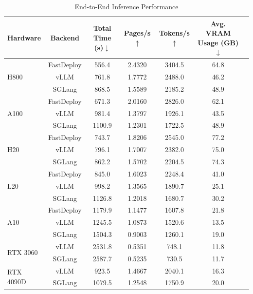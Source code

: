 \documentclass[11pt, a4paper,logo,  copyright, nonumbering]{paddleocr}
\begin{document}
\begin{table}[H]
  \centering

  \renewcommand{\arraystretch}{1.2}
  \begin{tabular}{l|c|ccccc}
    \toprule
    \textbf{Hardware} & \textbf{Backend} & \textbf{Total Time (s)$\downarrow$} & \textbf{Pages/s$\uparrow$} & \textbf{Tokens/s$\uparrow$} & \textbf{Avg. VRAM Usage (GB)$\downarrow$} \\
    \midrule
    \multirow{3}{*}{H800} & FastDeploy & 556.4 & 2.4320 & 3404.5 & 64.8 \\ & vLLM & 761.8 & 1.7772 & 2488.0 & 46.2 \\
                          & SGLang & 868.5 & 1.5589 & 2185.2 & 48.9 \\
    \midrule
    \multirow{3}{*}{A100} & FastDeploy & 671.3 & 2.0160 & 2826.0 & 62.1 \\ & vLLM & 981.4 & 1.3797 & 1926.1 & 43.5 \\
                          & SGLang & 1100.9 & 1.2301 & 1722.5 & 48.9 \\
    \midrule
    \multirow{3}{*}{H20} & FastDeploy & 743.7 & 1.8206 & 2545.0 & 77.2 \\ & vLLM & 796.1 & 1.7007 & 2382.0 & 75.0 \\
                          & SGLang & 862.2 & 1.5702 & 2204.5 & 74.3 \\
    \midrule
    \multirow{3}{*}{L20} & FastDeploy & 845.0 & 1.6023 & 2248.4 & 41.0 \\ & vLLM & 998.2 & 1.3565  & 1890.7 & 25.1 \\
                          & SGLang & 1126.8 & 1.2018 & 1680.7 & 30.2 \\
    \midrule
    \multirow{3}{*}{A10} & FastDeploy & 1179.9 & 1.1477 & 1607.8 & 21.8 \\ & vLLM & 1245.5 & 1.0873 & 1520.6 & 13.5 \\
                          & SGLang & 1504.3 & 0.9003 & 1260.1 & 19.0 \\
    \midrule
    \multirow{2}{*}{RTX 3060} & vLLM & 2531.8 & 0.5351 & 748.1 & 11.8 \\
                              & SGLang & 2587.7 & 0.5235 & 730.5 & 11.7 \\
    \midrule
    \multirow{2}{*}{RTX 4090D} & vLLM & 923.5 & 1.4667 & 2040.1 & 16.3 \\
                               & SGLang & 1079.5 & 1.2548 & 1750.9 & 20.0 \\
    \bottomrule
  \end{tabular}%
    \caption{End-to-End Inference Performance}
      \label{tab:inference_performance_hardware}
\end{table}
\end{document}
